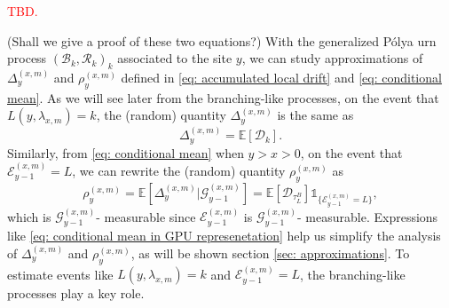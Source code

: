 \documentclass[twoside,12pt,a4paper]{article}
\numberwithin{equation}{section}
\newcommand\TBD{\textcolor{red}{TBD.}}
\begin{document}
	\TBD{(Shall we give a proof of these two equations?) With the generalized P\'{o}lya urn process $(\mathcal{B}_k,\mathcal{R}_k )_k$ associated to the site $y$, we can study approximations of $\Delta_{y}^{(x,m)}$ and $\rho_{y}^{(x,m)}$ defined in \eqref{eq: accumulated local drift} and \eqref{eq: conditional mean}. As we will see later from the branching-like processes, on the event that $ L(y,\lambda_{x,m}) = k$,  the (random) quantity $\Delta_{y}^{(x,m)}$ is the same as
		$$
		\Delta_{y}^{(x,m)} = \mathbb{E}\left[ \mathcal{D}_k \right].
		$$ 
		Similarly, from \eqref{eq: conditional mean} when $y> x >0$, on the event that $ \mathcal{E}^{(x,m)}_{y-1} = L $, we can rewrite the (random) quantity $ \rho_{y}^{(x,m)} $ as
		\begin{equation}\label{eq: conditional mean in GPU represenetation}
			\rho_{y}^{(x,m)} = \mathbb{E}\left[\Delta_{y}^{(x,m)} \vert \mathcal{G}_{y-1}^{(x,m)}\right] = \mathbb{E}\left[ \mathcal{D}_{\tau^B_L}  \right]\mathbb{1}_{\{  \mathcal{E}^{(x,m)}_{y-1} = L \}},
		\end{equation} which is $\mathcal{G}_{y-1}^{(x,m)}$- measurable since $\mathcal{E}^{(x,m)}_{y-1} $ is $\mathcal{G}_{y-1}^{(x,m)}$- measurable. Expressions like \eqref{eq: conditional mean in GPU represenetation} help us simplify the analysis of $\Delta_{y}^{(x,m)}$ and $\rho_{y}^{(x,m)}$, as will be shown section \ref{sec: approximations}. To estimate events like $ L(y,\lambda_{x,m}) = k$ and $\mathcal{E}^{(x,m)}_{y-1} = L $, the branching-like processes play a key role. 
		
		
}
\end{document}
